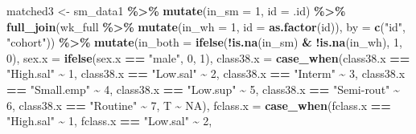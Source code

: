 \documentclass[
]{article}
\newenvironment{Shaded}{\begin{snugshade}}{\end{snugshade}}
\newcommand{\AttributeTok}[1]{\textcolor[rgb]{0.13,0.29,0.53}{#1}}
\newcommand{\ConstantTok}[1]{\textcolor[rgb]{0.56,0.35,0.01}{#1}}
\newcommand{\DecValTok}[1]{\textcolor[rgb]{0.00,0.00,0.81}{#1}}
\newcommand{\FunctionTok}[1]{\textcolor[rgb]{0.13,0.29,0.53}{\textbf{#1}}}
\newcommand{\NormalTok}[1]{#1}
\newcommand{\OtherTok}[1]{\textcolor[rgb]{0.56,0.35,0.01}{#1}}
\newcommand{\SpecialCharTok}[1]{\textcolor[rgb]{0.81,0.36,0.00}{\textbf{#1}}}
\newcommand{\StringTok}[1]{\textcolor[rgb]{0.31,0.60,0.02}{#1}}
\begin{document}
\begin{Shaded}
\begin{Highlighting}[]
\NormalTok{matched3 }\OtherTok{\textless{}{-}}\NormalTok{ sm\_data1 }\SpecialCharTok{\%\textgreater{}\%}
  \FunctionTok{mutate}\NormalTok{(}\AttributeTok{in\_sm =} \DecValTok{1}\NormalTok{,}
         \AttributeTok{id =}\NormalTok{ .id) }\SpecialCharTok{\%\textgreater{}\%}
  \FunctionTok{full\_join}\NormalTok{(wk\_full }\SpecialCharTok{\%\textgreater{}\%} \FunctionTok{mutate}\NormalTok{(}\AttributeTok{in\_wh =} \DecValTok{1}\NormalTok{,}
                               \AttributeTok{id =} \FunctionTok{as.factor}\NormalTok{(id)), }
            \AttributeTok{by =} \FunctionTok{c}\NormalTok{(}\StringTok{"id"}\NormalTok{, }\StringTok{"cohort"}\NormalTok{)) }\SpecialCharTok{\%\textgreater{}\%}
  \FunctionTok{mutate}\NormalTok{(}\AttributeTok{in\_both =} \FunctionTok{ifelse}\NormalTok{(}\SpecialCharTok{!}\FunctionTok{is.na}\NormalTok{(in\_sm) }\SpecialCharTok{\&} \SpecialCharTok{!}\FunctionTok{is.na}\NormalTok{(in\_wh), }\DecValTok{1}\NormalTok{, }\DecValTok{0}\NormalTok{),}
         \AttributeTok{sex.x =} \FunctionTok{ifelse}\NormalTok{(sex.x }\SpecialCharTok{==} \StringTok{"male"}\NormalTok{, }\DecValTok{0}\NormalTok{, }\DecValTok{1}\NormalTok{),}
         \AttributeTok{class38.x =} \FunctionTok{case\_when}\NormalTok{(class38.x }\SpecialCharTok{==} \StringTok{"High.sal"} \SpecialCharTok{\textasciitilde{}} \DecValTok{1}\NormalTok{,}
\NormalTok{                               class38.x }\SpecialCharTok{==} \StringTok{"Low.sal"} \SpecialCharTok{\textasciitilde{}} \DecValTok{2}\NormalTok{,}
\NormalTok{                               class38.x }\SpecialCharTok{==} \StringTok{"Interm"} \SpecialCharTok{\textasciitilde{}} \DecValTok{3}\NormalTok{,}
\NormalTok{                               class38.x }\SpecialCharTok{==} \StringTok{"Small.emp"} \SpecialCharTok{\textasciitilde{}} \DecValTok{4}\NormalTok{,}
\NormalTok{                               class38.x }\SpecialCharTok{==} \StringTok{"Low.sup"} \SpecialCharTok{\textasciitilde{}} \DecValTok{5}\NormalTok{,}
\NormalTok{                               class38.x }\SpecialCharTok{==} \StringTok{"Semi{-}rout"} \SpecialCharTok{\textasciitilde{}} \DecValTok{6}\NormalTok{,}
\NormalTok{                               class38.x }\SpecialCharTok{==} \StringTok{"Routine"} \SpecialCharTok{\textasciitilde{}} \DecValTok{7}\NormalTok{,}
\NormalTok{                               T }\SpecialCharTok{\textasciitilde{}} \ConstantTok{NA}\NormalTok{),}
         \AttributeTok{fclass.x =} \FunctionTok{case\_when}\NormalTok{(fclass.x }\SpecialCharTok{==} \StringTok{"High.sal"} \SpecialCharTok{\textasciitilde{}} \DecValTok{1}\NormalTok{,}
\NormalTok{                               fclass.x }\SpecialCharTok{==} \StringTok{"Low.sal"} \SpecialCharTok{\textasciitilde{}} \DecValTok{2}\NormalTok{,}

\end{Highlighting}
\end{Shaded}
\end{document}
